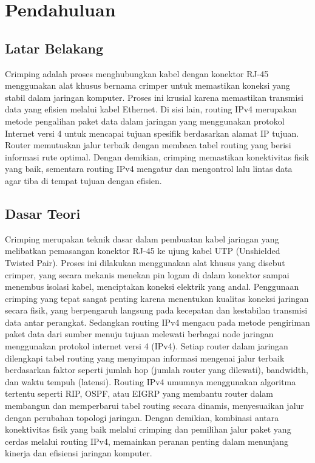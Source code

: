 \section{Pendahuluan}
\subsection{Latar Belakang}
Crimping adalah proses menghubungkan kabel dengan konektor RJ-45 menggunakan alat khusus bernama crimper untuk memastikan koneksi yang stabil dalam jaringan komputer. Proses ini krusial karena memastikan transmisi data yang efisien melalui kabel Ethernet. Di sisi lain, routing IPv4 merupakan metode pengalihan paket data dalam jaringan yang menggunakan protokol Internet versi 4 untuk mencapai tujuan spesifik berdasarkan alamat IP tujuan. Router memutuskan jalur terbaik dengan membaca tabel routing yang berisi informasi rute optimal. Dengan demikian, crimping memastikan konektivitas fisik yang baik, sementara routing IPv4 mengatur dan mengontrol lalu lintas data agar tiba di tempat tujuan dengan efisien.

\subsection{Dasar Teori}
Crimping merupakan teknik dasar dalam pembuatan kabel jaringan yang melibatkan pemasangan konektor RJ-45 ke ujung kabel UTP (Unshielded Twisted Pair). Proses ini dilakukan menggunakan alat khusus yang disebut crimper, yang secara mekanis menekan pin logam di dalam konektor sampai menembus isolasi kabel, menciptakan koneksi elektrik yang andal. Penggunaan crimping yang tepat sangat penting karena menentukan kualitas koneksi jaringan secara fisik, yang berpengaruh langsung pada kecepatan dan kestabilan transmisi data antar perangkat. Sedangkan routing IPv4 mengacu pada metode pengiriman paket data dari sumber menuju tujuan melewati berbagai node jaringan menggunakan protokol internet versi 4 (IPv4). Setiap router dalam jaringan dilengkapi tabel routing yang menyimpan informasi mengenai jalur terbaik berdasarkan faktor seperti jumlah hop (jumlah router yang dilewati), bandwidth, dan waktu tempuh (latensi). Routing IPv4 umumnya menggunakan algoritma tertentu seperti RIP, OSPF, atau EIGRP yang membantu router dalam membangun dan memperbarui tabel routing secara dinamis, menyesuaikan jalur dengan perubahan topologi jaringan. Dengan demikian, kombinasi antara konektivitas fisik yang baik melalui crimping dan pemilihan jalur paket yang cerdas melalui routing IPv4, memainkan peranan penting dalam menunjang kinerja dan efisiensi jaringan komputer.

